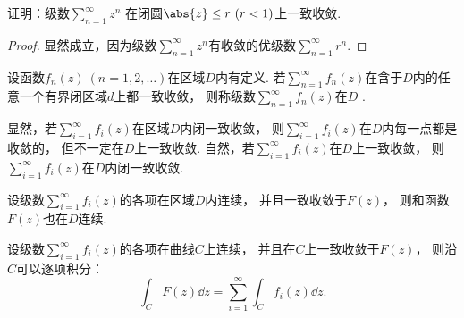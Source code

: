 \begin{example}
证明：级数\(\sum_{n=1}^\infty z^n\)
在闭圆\(\abs{z} \leq r\ (r<1)\)上一致收敛.
\begin{proof}
显然成立，因为级数\(\sum_{n=1}^\infty z^n\)有收敛的优级数\(\sum_{n=1}^\infty r^n\).
\end{proof}
\end{example}

\begin{definition}
设函数\(f_n(z)\ (n=1,2,\dots)\)在区域\(D\)内有定义.
若\(\sum_{n=1}^\infty f_n(z)\)在含于\(D\)内的任意一个有界闭区域\(d\)上都一致收敛，
则称级数\(\sum_{n=1}^\infty f_n(z)\)在\(D\) .
\end{definition}
显然，若\(\sum_{i=1}^\infty f_i(z)\)在区域\(D\)内闭一致收敛，
则\(\sum_{i=1}^\infty f_i(z)\)在\(D\)内每一点都是收敛的，
但不一定在\(D\)上一致收敛.
自然，若\(\sum_{i=1}^\infty f_i(z)\)在\(D\)上一致收敛，
则\(\sum_{i=1}^\infty f_i(z)\)在\(D\)内闭一致收敛.

\begin{theorem}\label{theorem:解析函数的级数表示.一致收敛级数的基本性质1}
设级数\(\sum_{i=1}^\infty f_i(z)\)的各项在区域\(D\)内连续，
并且一致收敛于\(F(z)\)，
则和函数\(F(z)\)也在\(D\)连续.
\end{theorem}

\begin{theorem}\label{theorem:解析函数的级数表示.一致收敛级数的基本性质2}
设级数\(\sum_{i=1}^\infty f_i(z)\)的各项在曲线\(C\)上连续，
并且在\(C\)上一致收敛于\(F(z)\)，
则沿\(C\)可以逐项积分：\begin{equation*}
	\int_C F(z) \dd{z}
	= \sum_{i=1}^\infty \int_C f_i(z) \dd{z}.
\end{equation*}
\end{theorem}


